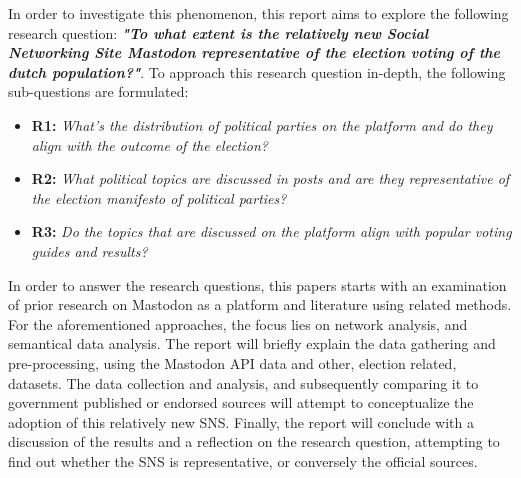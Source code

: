 In order to investigate this phenomenon, this report aims to explore the following research question:
\textbf{\textit{"To what extent is the relatively new Social Networking Site Mastodon representative of the election voting of the dutch population?"}}.
To approach this research question in-depth, the following sub-questions are formulated:
\begin{itemize}
  \item \textbf{R1:} \textit{What's the distribution of political parties on the platform and do they align with the outcome of the election? }
  \item \textbf{R2:} \textit{What political topics are discussed in posts and are they representative of the election manifesto of political parties? }
  \item \textbf{R3:} \textit{Do the topics that are discussed on the platform align with popular voting guides and results?}
\end{itemize}

In order to answer the research questions, this papers starts with an examination of prior research on Mastodon as a platform and literature using related methods.
For the aforementioned approaches, the focus lies on network analysis, and semantical data analysis.
The report will briefly explain the data gathering and pre-processing, using the Mastodon API data and other, election related, datasets.
The data collection and analysis, and subsequently comparing it to government published or endorsed sources will attempt to conceptualize the adoption of this relatively new SNS.
Finally, the report will conclude with a discussion of the results and a reflection on the research question, attempting to find out whether the SNS is representative, or conversely the official sources.